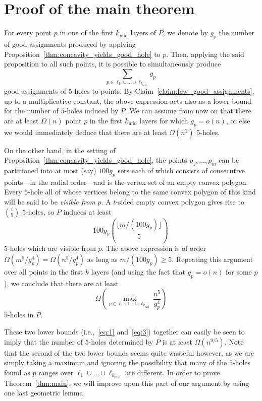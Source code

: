 \documentclass[12pt,reqno, a4paper]{amsart}
\begin{document}
\section{Proof of the main theorem}\label{sec:main}
For every point $p$ in one of the first $k_{\operatorname{mid}}$ layers of $P$, we denote by $g_{p}$ the number of good assignments produced by applying Proposition~\ref{thm:concavity_yields_good_hole} to $p$. Then, applying the said proposition to all such points, it is possible to simultaneously produce
\begin{equation}\label{eq:1}
\sum_{p\in \ell_1\cup\dots\cup\ell_{k_{\operatorname{mid}}}}g_p\,
\end{equation} 
good assignments of $5$-holes to points. By Claim~\ref{claim:few_good_assignments}, up to a multiplicative constant, the above expression acts also as a lower bound for the number of $5$-holes induced by $P$. We can assume from now on that there are at least $\Omega(n)$ point $p$ in the first $k_{\operatorname{mid}}$ layers for which $g_p=o(n)$, or else we would immediately deduce that there are at least $\Omega(n^2)$ $5$-holes. 

On the other hand, in the setting of Proposition~\ref{thm:concavity_yields_good_hole}, the points $p_1,\dots,p_m$ can be partitioned into at most (say) $100g_p$ sets each of which consists of consecutive points---in the radial order---and is the vertex set of an empty convex polygon. Every $5$-hole all of whose vertices belong to the same convex polygon of this kind will be said to be \textit{visible from} $p$. A $t$-sided empty convex polygon gives rise to $\binom{t}{5}$ $5$-holes, so $P$ induces at least \begin{equation}\label{eq:2}100g_p\binom{\lfloor m/(100g_p)\rfloor}{5}\,\end{equation} $5$-holes which are visible from $p$. The above expression is of order $\Omega(m^5/g_p^4)=\Omega(n^5/g_p^4)$ as long as $m/(100g_p)\geq 5$. Repeating this argument over all points in the first $k$ layers (and using the fact that $g_p=o(n)$ for some $p$), we conclude that there are at least
\begin{equation}\label{eq:3}
\Omega\left(\max_{p\in \ell_1\cup\dots\cup\ell_{k_{\operatorname{mid}}}} \frac{n^5}{g_p^4}\right)
\end{equation} 
$5$-holes in $P$. 

These two lower bounds (i.e.,~\eqref{eq:1} and~\eqref{eq:3}) together can easily be seen to imply that the number of $5$-holes determined by $P$ is at least $\Omega(n^{9/5})$. Note that the second of the two lower bounds seems quite wasteful however, as we are simply taking a maximum and ignoring the possibility that many of the $5$-holes found as $p$ ranges over $\ell_1\cup\dots\cup\ell_{k_{\operatorname{mid}}}$ are different. In order to prove Theorem~\ref{thm:main}, we will improve upon this part of our argument by using one last geometric lemma.
\end{document}
